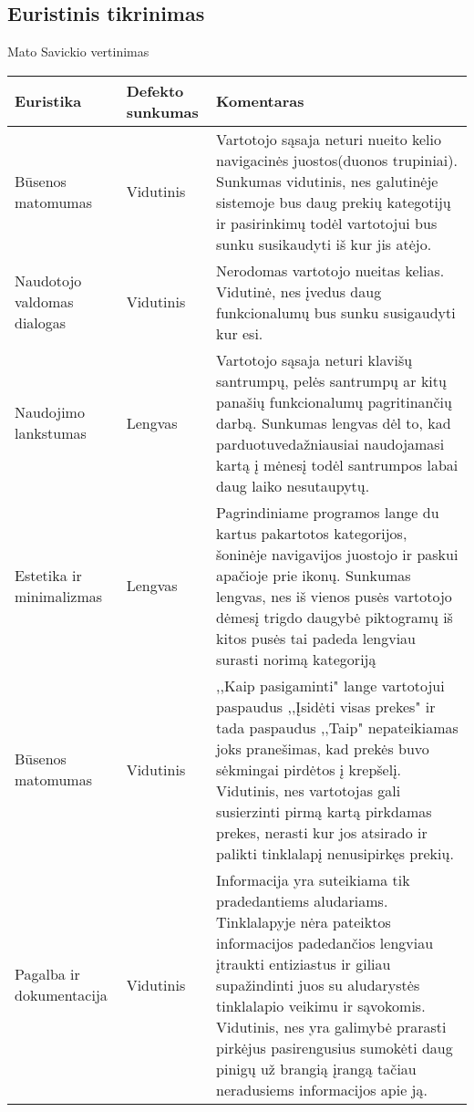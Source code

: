\documentclass[oneside]{VUMIFPSkursinis}
\begin{document}
	\subsection{Euristinis tikrinimas}
Mato Savickio vertinimas
\begin{center}
    \begin{tabular}{ |p{3cm}| p{3cm} | p{11cm} | }
    \hline
   	 Euristika &Defekto sunkumas &Komentaras \\ \hline 
	Būsenos matomumas & Vidutinis & Vartotojo sąsaja neturi nueito kelio navigacinės juostos(duonos trupiniai). Sunkumas vidutinis, nes galutinėje sistemoje bus daug prekių kategotijų ir pasirinkimų todėl vartotojui bus sunku susikaudyti iš kur jis atėjo. \\ \hline
	Naudotojo valdomas dialogas & Vidutinis & Nerodomas vartotojo nueitas kelias. Vidutinė, nes įvedus daug funkcionalumų bus sunku susigaudyti kur esi. \\ \hline
	Naudojimo lankstumas & Lengvas & Vartotojo sąsaja neturi klavišų santrumpų, pelės santrumpų ar kitų panašių funkcionalumų pagritinančių darbą.
							Sunkumas lengvas dėl to, kad parduotuvedažniausiai naudojamasi kartą į mėnesį todėl santrumpos labai daug laiko nesutaupytų. \\ \hline
	Estetika ir minimalizmas & Lengvas & Pagrindiniame programos lange du kartus pakartotos kategorijos, šoninėje navigavijos juostojo ir paskui apačioje prie ikonų. Sunkumas lengvas, nes iš vienos pusės vartotojo dėmesį trigdo daugybė piktogramų iš kitos pusės tai padeda lengviau surasti norimą kategoriją \\ \hline
	Būsenos matomumas & Vidutinis & ,,Kaip pasigaminti" lange vartotojui paspaudus ,,Įsidėti visas prekes" ir tada paspaudus ,,Taip" nepateikiamas joks pranešimas, kad prekės buvo sėkmingai  pirdėtos į krepšelį. Vidutinis, nes vartotojas gali susierzinti pirmą kartą pirkdamas prekes, nerasti kur jos atsirado ir palikti tinklalapį nenusipirkęs prekių. \\ \hline
	Pagalba ir dokumentacija & Vidutinis & Informacija yra suteikiama tik pradedantiems aludariams.
							Tinklalapyje nėra pateiktos informacijos padedančios lengviau įtraukti entiziastus ir giliau supažindinti juos su aludarystės tinklalapio veikimu ir sąvokomis. Vidutinis, nes yra galimybė prarasti pirkėjus pasirengusius sumokėti daug pinigų už brangią įrangą tačiau neradusiems informacijos apie ją. \\ \hline
	
   \hline
    \end{tabular}
\end{center}
\pagebreak
\end{document}
